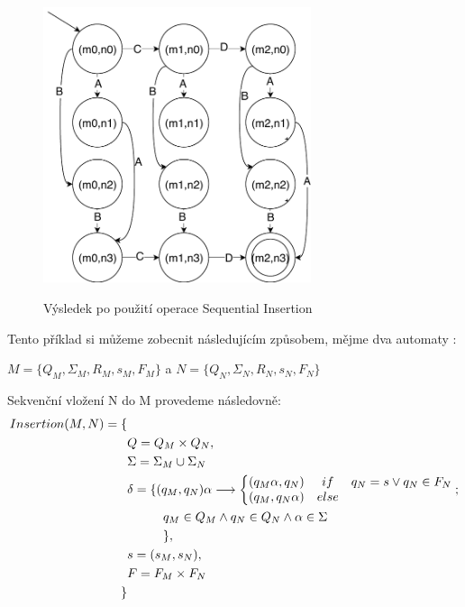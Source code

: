 \begin{figure}[H]
\centering
\includegraphics[width=0.7\textwidth]{obrazky-figures/IsertionPrikladResult.pdf}
\label{imgExample:insertionTeoryRes}
\caption{Výsledek po použití operace Sequential Insertion}
\end{figure}



Tento příklad si můžeme zobecnit následujícím způsobem, mějme dva automaty :

$M=\{Q_{M}, \Sigma_{M}, R_{M},s_{M}, F_{M}\}$ a $N=\{Q_{N}, \Sigma_{N}, R_{N},s_{N}, F_{N}\} $

Sekvenční vložení N do M provedeme následovně:
\begin{equation}
\label{eqA:Insertion}
\begin{split}
    Insertion(M,N) = \{ &\\
           &Q = Q_{M} \times Q_{N},\\
    &  \Sigma = \Sigma_{M} \cup \Sigma_{N} \\
    & \delta = \{ (q_{M},q_{N})\alpha \longrightarrow \left\{\begin{matrix}
 (q_{M}\alpha, q_{N})& if & q_{N}=s \vee q_N \in F_{N}\\ 
 (q_{M}, q_{N}\alpha)& else & 
\end{matrix}\right.;\\
    &\hspace*{1cm} q_{M} \in Q_{M} \land q_{N} \in Q_{N} \land \alpha \in \Sigma\\
    &\hspace*{1cm}\}, \\
    & s = (s_{M}, s_{N}), \\
    & F = F_{M} \times F_{N} \\
    \}&
\end{split}
\end{equation}


